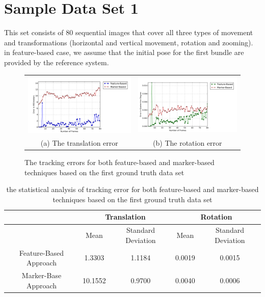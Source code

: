 \section{Sample Data Set 1} \label{sec:sample_01}
This set consists of 80 sequential images that cover all three types of movement and transformations (horizontal and vertical movement, rotation and zooming). in feature-based case, we assume that the initial pose for the first bundle are provided by the reference system.

\begin{figure}[H]
\begin{tabular}{cc}
  \includegraphics[width=80mm]{figures/global_35/graph_translation} &  \includegraphics[width=80mm]{figures/global_35/graph_rotation} \\
(a) The translation error & (b) The rotation error \\[6pt]
\end{tabular}
\caption{The tracking errors for both feature-based and marker-based techniques based on the first ground truth data set}   \label{fig:sample_01}
\end{figure}

\begin{table}[H]
\centering
  \begin{tabular}{| c || c | c | c | c |}
      \hline
      & \multicolumn{2}{c|}{Translation} & \multicolumn{2}{c|}{Rotation} \\ \hline
       & Mean & Standard Deviation & Mean & Standard Deviation \\ \hline
      Feature-Based Approach & 1.3303 & 1.1184 & 0.0019 & 0.0015 \\ \hline
      Marker-Base Approach & 10.1552 & 0.9700 & 0.0040 & 0.0006 \\ \hline
  \end{tabular}
  \caption{the statistical analysis of tracking error for both feature-based and marker-based techniques based on the first ground truth data set} \label{tab:sample_01}
\end{table}

